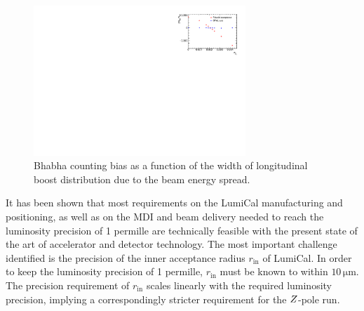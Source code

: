 \begin{figure}
   \centering
   \includegraphics[width=8cm]{beamEnergySpread}
   \caption{Bhabha counting bias as a function of the width of longitudinal boost distribution due to the beam energy spread. }
   \label{fig:bes}
\end{figure}

It has been shown that most requirements on the LumiCal manufacturing and positioning, as well as on the MDI and beam delivery needed to reach the luminosity precision of 1 permille are technically feasible with the present state of the art of accelerator and detector technology. The most important challenge identified is the precision of the inner acceptance radius $r_{\text{in}}$ of LumiCal. In order to keep the luminosity precision of 1 permille, $r_{\text{in}}$ must be known to within $10\,\mathrm{\mu m}$. The precision requirement of $r_{\text{in}}$ scales linearly with the required luminosity precision, implying a correspondingly stricter requirement for the $Z$-pole run.




